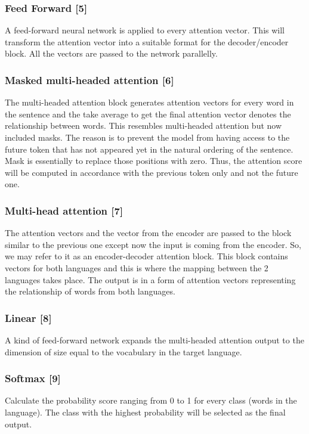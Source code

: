 \documentclass[12pt,oneside,openright,a4paper]{cpe-english-project}
\begin{document}
\subsubsection{Feed Forward [5]}
A feed-forward neural network is applied to every attention vector. This will transform the attention vector into a suitable format for the decoder/encoder block. All the vectors are passed to the network parallelly.

\subsubsection{Masked multi-headed attention [6]}
The multi-headed attention block generates attention vectors for every word in the sentence and the take average to get the final attention vector denotes the relationship between words. This resembles multi-headed attention but now included masks.
The reason is to prevent the model from having access to the future token that has not appeared yet in the natural ordering of the sentence. Mask is essentially to replace those positions with zero. Thus, the attention score will be computed in accordance with the previous token only and not the future one. 

\subsubsection{Multi-head attention [7]}
The attention vectors and the vector from the encoder are passed to the block similar to the previous one except now the input is coming from the encoder. So, we may refer to it as an encoder-decoder attention block. This block contains vectors for both languages and this is where the mapping between the 2 languages takes place. The output is in a form of attention vectors representing the relationship of words from both languages. 

\subsubsection{Linear [8]}
A kind of feed-forward network expands the multi-headed attention output to the dimension of size equal to the vocabulary in the target language. 

\subsubsection{Softmax [9]}
Calculate the probability score ranging from 0 to 1 for every class (words in the language). The class with the highest probability will be selected as the final output.
\end{document}
